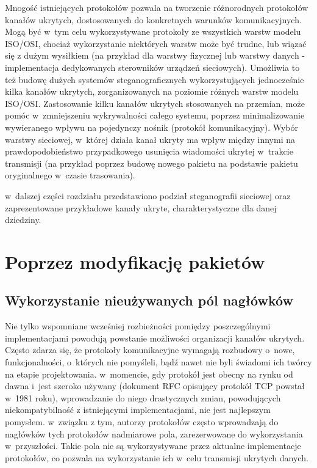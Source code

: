 \documentclass[a4paper, twoside, 12pt]{report}
\begin{document}
    Mnogość istniejących protokołów pozwala na tworzenie różnorodnych protokołów
    kanałów ukrytych, dostosowanych do konkretnych warunków komunikacyjnych.
    Mogą być w~tym celu wykorzystywane protokoły ze wszystkich warstw modelu
    ISO/OSI, chociaż wykorzystanie niektórych warstw może być trudne, lub wiązać
    się z dużym wysiłkiem (na przykład dla warstwy fizycznej lub warstwy danych -
    implementacja dedykowanych sterowników urządzeń sieciowych). Umożliwia to
    też budowę dużych systemów steganograficznych wykorzystujących jednocześnie
    kilka kanałów ukrytych, zorganizowanych na poziomie różnych warstw modelu ISO/OSI.
    Zastosowanie kilku kanałów ukrytych stosowanych na przemian, może pomóc w~zmniejszeniu
    wykrywalności całego systemu, poprzez minimalizowanie wywieranego wpływu na pojedynczy
    nośnik (protokół komunikacyjny). Wybór warstwy sieciowej, w~której działa kanał ukryty
    ma wpływ między innymi na prawdopodobieństwo przypadkowego usunięcia wiadomości
    ukrytej w~trakcie transmisji (na przykład poprzez budowę nowego pakietu na podstawie
    pakietu oryginalnego w~czasie trasowania).

    w~dalszej części rozdziału przedstawiono podział steganografii sieciowej
    oraz zaprezentowane przykładowe kanały ukryte, charakterystyczne dla danej
    dziedziny.
    \section{Poprzez modyfikację pakietów} \label{MODYFIKACJAPAKIETOW}
        \subsection{Wykorzystanie nieużywanych pól nagłówków}
        Nie tylko wspomniane wcześniej rozbieżności pomiędzy poszczególnymi
        implementacjami powodują powstanie możliwości organizacji kanałów ukrytych.
        Często zdarza się, że protokoły komunikacyjne wymagają rozbudowy o~nowe,
        funkcjonalności, o~których nie pomyśleli, bądź nawet nie byli świadomi
        ich twórcy na etapie projektowania. w~momencie, gdy protokół jest obecny
        na rynku od dawna i~jest szeroko używany (dokument RFC opisujący protokół TCP
        powstał w~1981 roku\cite{TCPRFC}), wprowadzanie do niego drastycznych zmian,
        powodujących niekompatybilność z istniejącymi implementacjami, nie jest
        najlepszym pomysłem. w~związku z tym, autorzy protokołów często wprowadzają
        do nagłówków tych protokołów nadmiarowe pola, zarezerwowane do wykorzystania
        w~przyszłości. Takie pola nie są wykorzystywane przez aktualne implementacje
        protokołów, co pozwala na wykorzystanie ich w~celu transmisji ukrytych danych.
\end{document}
